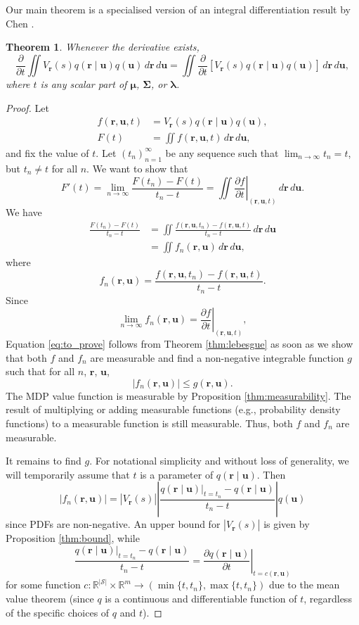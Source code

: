 \documentclass{mpaper}
\newtheorem{theorem}{Theorem}[section]
\newcommand{\V}{V_{\mathbf{r}}}
\newcommand{\dx}{\,d\mathbf{r}\,d\mathbf{u}}
\newcommand{\f}{f(\mathbf{r}, \mathbf{u}, t)}
\newcommand{\fn}{f_n(\mathbf{r}, \mathbf{u})}
\newcommand{\ftn}{f(\mathbf{r}, \mathbf{u}, t_n)}
\newcommand{\g}{g(\mathbf{r}, \mathbf{u})}
\newcommand{\dt}{\frac{\partial}{\partial t}}
\newcommand{\df}{\left.\frac{\partial f}{\partial t}\right|_{(\mathbf{r},
    \mathbf{u}, t)}}
\begin{document}
Our main theorem is a specialised version of an integral differentiation result
by Chen \cite{lecture_notes}.
\begin{theorem} \label{thm:main}
  Whenever the derivative exists,
  \[
    \dt\iint
    \V(s)q(\mathbf{r} \mid \mathbf{u})q(\mathbf{u})\dx
    = \iint
    \dt[\V(s)q(\mathbf{r} \mid \mathbf{u})q(\mathbf{u})]\dx,
  \]
  where $t$ is any scalar part of $\bm\mu$, $\bm\Sigma$, or $\bm\lambda$.
\end{theorem}
\begin{proof}
  Let
  \begin{align*}
    \f &= \V(s)q(\mathbf{r} \mid \mathbf{u})q(\mathbf{u}), \\
    F(t) &= \iint \f\dx,
  \end{align*}
  and fix the value of $t$. Let $(t_n)_{n=1}^\infty$ be any sequence such that
  $\lim_{n \to \infty} t_n = t$, but $t_n \ne t$ for all $n$. We want to show
  that
  \begin{equation} \label{eq:to_prove}
    F'(t) = \lim_{n \to \infty} \frac{F(t_n) - F(t)}{t_n - t} = \iint \df\dx.
  \end{equation}
  We have
  \[
    \begin{split}
      \frac{F(t_n) - F(t)}{t_n - t} &= \iint \frac{\ftn - \f}{t_n - t}\dx \\
      &= \iint \fn\dx,
    \end{split}
  \]
  where
  \[
    \fn = \frac{\ftn - \f}{t_n - t}.
  \]
  Since
  \[
    \lim_{n \to \infty} \fn = \df,
  \]
  Equation \ref{eq:to_prove} follows from Theorem \ref{thm:lebesgue} as soon as we show
  that both $f$ and $f_n$ are measurable and find a non-negative integrable
  function $g$ such that for all $n$, $\mathbf{r}$, $\mathbf{u}$,
  \[
    |\fn| \le \g.
  \]
  The MDP value function is measurable by Proposition \ref{thm:measurability}.
  The result of multiplying or adding measurable functions (e.g., probability
  density functions) to a measurable function is still measurable. Thus,
  both $f$ and $f_n$ are measurable.

  It remains to find $g$. For notational simplicity and without loss of
  generality, we will temporarily assume that $t$ is a parameter of
  $q(\mathbf{r} \mid \mathbf{u})$. Then
  \[
    |\fn| = |\V(s)| \left| \frac{q(\mathbf{r} \mid \mathbf{u})|_{t =
          t_n} - q(\mathbf{r} \mid \mathbf{u})}{t_n - t} \right| q(\mathbf{u})
  \]
  since PDFs are non-negative. An upper bound for
  $|\V(s)|$ is given by Proposition \ref{thm:bound}, while
  \[
    \frac{q(\mathbf{r} \mid \mathbf{u})|_{t = t_n} - q(\mathbf{r} \mid \mathbf{u})}{t_n - t} = \left.
      \frac{\partial q(\mathbf{r} \mid \mathbf{u})}{\partial t} \right|_{t = c(\mathbf{r},
      \mathbf{u})}
  \]
  for some function $c : \mathbb{R}^{|\mathcal{S}|} \times \mathbb{R}^m \to
  (\min\{t, t_n\}, \max\{t, t_n\})$ due to the mean value theorem (since $q$ is
  a continuous and differentiable function of $t$, regardless of the specific
  choices of $q$ and $t$).


\end{proof}
\end{document}
